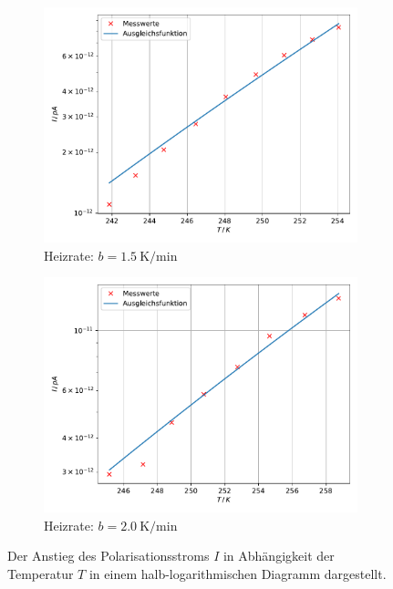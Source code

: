 \begin{figure}
    \begin{subfigure}{0.48\textwidth}
        \centering
        \includegraphics[height=0.8\textwidth]{content/data/W_approx_15.pdf}
        \caption{Heizrate: $b = \SI{1.5}{\kelvin \per \minute}$}
        \label{subfig:approx_15}
    \end{subfigure}
    \hfill
    \begin{subfigure}{0.48\textwidth}
        \centering
        \includegraphics[height=0.8\textwidth]{content/data/W_approx_20.pdf}
        \caption{Heizrate: $b = \SI{2.0}{\kelvin \per \minute}$}
        \label{subfig:approx_20}
    \end{subfigure}
    \caption{Der Anstieg des Polarisationsstroms $I$ in Abhängigkeit der Temperatur $T$ in einem halb-logarithmischen Diagramm dargestellt.\cite{matplotlib}\cite{scipy}\cite{numpy}}
    \label{fig:approx}
\end{figure}
\FloatBarrier

